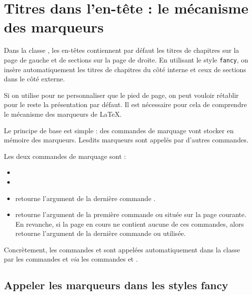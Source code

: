 \section{Titres dans l'en-tête : le mécanisme des marqueurs}

Dans la classe , les en-têtes contiennent par défaut les titres de chapitres sur la page de gauche et de sections sur la page de droite. En utilisant le style \verb|fancy|, on insère automatiquement les titres de chapitres du côté interne et ceux de sections dans le côté externe. 

Si on utilise  pour ne personnaliser que le pied de page, on peut  vouloir rétablir pour le reste la présentation  par défaut. Il est nécessaire pour cela de comprendre le mécanisme des marqueurs de \LaTeX. 

Le principe de base est simple : des commandes de marquage vont stocker en mémoire des marqueurs. Lesdits marqueurs sont appelés par d'autres commandes. 

Les deux commandes de marquage sont :
\begin{itemize}
\item {}
\item {}
\end{itemize}

\begin{itemize}
\item {} retourne l'argument  de la dernière commande .
\item {} retourne l'argument  de la première commande  ou   située sur la page courante. En revanche, si la page en cours ne contient aucune de ces commandes, alors  retourne l'argument  de la dernière commande  ou  utilisée.
\end{itemize}

Concrètement, les commandes   et  sont appelées automatiquement dans la classe  par les commandes  et  \emph{via} les commandes  et . 

\subsection{Appeler les marqueurs dans les styles fancy}


